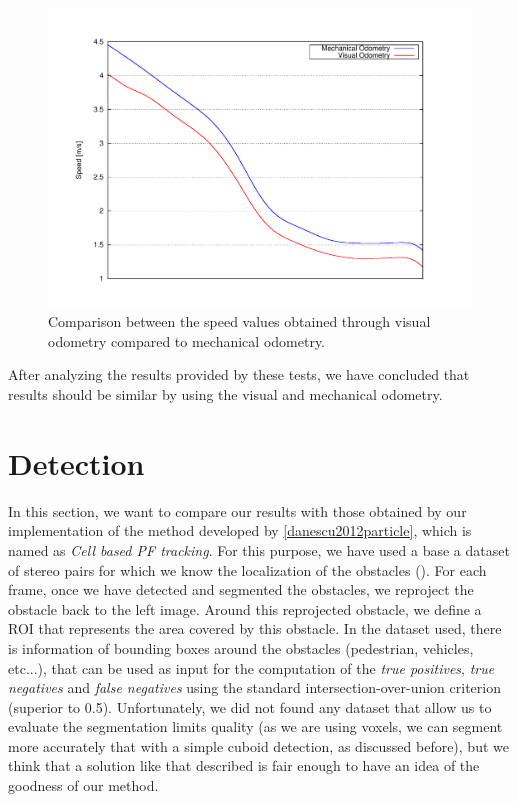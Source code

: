 \begin{figure}[th]
  \centering
  \includegraphics[trim=50 50 90 60, clip]{speed}
  \caption{Comparison between the speed values obtained through visual odometry compared to mechanical odometry.}\label{fig:cp05_ego_speed}
\end{figure}

After analyzing the results provided by these tests, we have concluded that results should be similar by using the visual and mechanical odometry.

\section{Detection}\label{ch:chapter05_02_03}

In this section, we want to compare our results with those obtained by our implementation of the method developed by \ref{danescu2012particle}, which is named as \emph{Cell based PF tracking}. For this purpose, we have used a base a dataset of stereo pairs for which we know the localization of the obstacles (\cite{geiger2013vision}). For each frame, once we have detected and segmented the obstacles, we reproject the obstacle back to the left image. Around this reprojected obstacle, we define a \ac{ROI} that represents the area covered by this obstacle. In the dataset used, there is information of bounding boxes around the obstacles (pedestrian, vehicles, etc...), that can be used as input for the computation of the \emph{true positives}, \emph{true negatives} and \emph{false negatives} using the standard intersection-over-union criterion (superior to 0.5). Unfortunately, we did not found any dataset that allow us to evaluate the segmentation limits quality (as we are using voxels, we can segment more accurately that with a simple cuboid detection, as discussed before), but we think that a solution like that described is fair enough to have an idea of the goodness of our method. 

